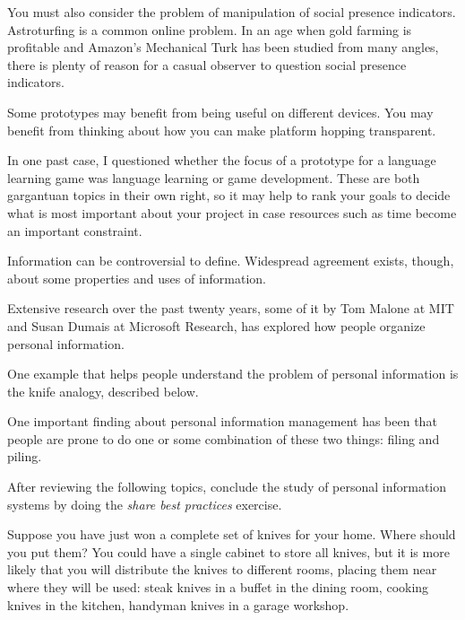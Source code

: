 You must also consider the problem of manipulation of social presence
indicators. Astroturfing is a common online problem. In an age when gold
farming is profitable and Amazon's Mechanical Turk has been studied from
many angles, there is plenty of reason for a casual observer to question
social presence indicators.

\hypertarget{form-factor}{%
\label{form-factor}}

Some prototypes may benefit from being useful on different devices. You
may benefit from thinking about how you can make platform hopping
transparent.

\hypertarget{project-focus}{%
\label{project-focus}}

In one past case, I questioned whether the focus of a prototype for a
language learning game was language learning or game development. These
are both gargantuan topics in their own right, so it may help to rank
your goals to decide what is most important about your project in case
resources such as time become an important constraint.

\hypertarget{personal-information}{%
\label{personal-information}}

Information can be controversial to define. Widespread agreement exists,
though, about some properties and uses of information.

\hypertarget{personal-information-systems}{%
\label{personal-information-systems}}

Extensive research over the past twenty years, some of it by Tom Malone
at MIT and Susan Dumais at Microsoft Research, has explored how people
organize personal information.

One example that helps people understand the problem of personal
information is the knife analogy, described below.

One important finding about personal information management has been
that people are prone to do one or some combination of these two things:
filing and piling.

After reviewing the following topics, conclude the study of personal
information systems by doing the \emph{share best practices} exercise.

\hypertarget{knives-in-the-home}{%
\label{knives-in-the-home}}

Suppose you have just won a complete set of knives for your home. Where
should you put them? You could have a single cabinet to store all
knives, but it is more likely that you will distribute the knives to
different rooms, placing them near where they will be used: steak knives
in a buffet in the dining room, cooking knives in the kitchen, handyman
knives in a garage workshop.

